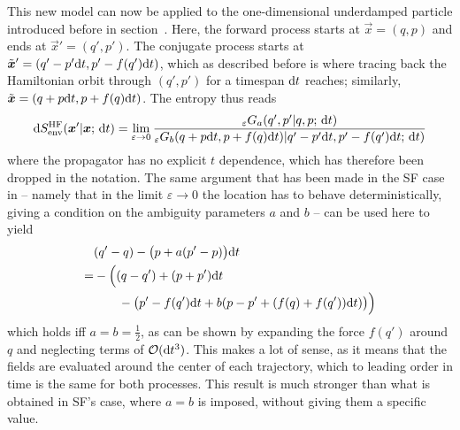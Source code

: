 This new model can now be applied to the one-dimensional underdamped particle introduced before in section~. Here, the forward process starts at \(\vec x = (q,p)\) and ends at \(\vec x' = (q',p')\). The conjugate process starts at \(\tilde{\boldsymbol{x}}' = (q'-p'\mathrm{d} t, p'-f(q')\mathrm{d} t)\), which as described before is where tracing back the Hamiltonian orbit through \((q',p')\) for a timespan \(\mathrm{d} t\) reaches; similarly, \(\tilde{\boldsymbol{x}} = (q+p\mathrm{d} t, p+f(q)\mathrm{d} t)\). The entropy thus reads
%
\begin{equation}
	\label{eqn:flow entropy quotient}
	\mathrm{d}S_\text{env}^{\text{HF}}(\boldsymbol{x}'|\boldsymbol{x};\,\mathrm{d} t)
	= \lim_{\varepsilon\to0}
		\frac{
			_\varepsilon G_a(q',p'|q,p;\,\mathrm{d} t)
		}{
			_\varepsilon G_b(q+p\mathrm{d} t, p+f(q)\mathrm{d} t)|q'-p'\mathrm{d} t, p'-f(q')\mathrm{d} t;\,\mathrm{d} t)
		}
\end{equation}
%
where the propagator has no explicit \(t\) dependence, which has therefore been dropped in the notation. The same argument that has been made in the SF case in  -- namely that in the limit \(\varepsilon\to0\) the location has to behave deterministically, giving a condition on the ambiguity parameters \(a\) and \(b\) -- can be used here to yield
%
\begin{equation}
	\begin{split}
	&(q'-q)-\bigl(p+a(p'-p)\bigr)\mathrm{d} t
	\\=&
	-\Bigl( (q-q')+(p+p')\mathrm{d} t \\
	&\qquad - \bigl( p'-f(q')\mathrm{d} t + b(p-p'+(f(q)+f(q'))\mathrm{d} t)\bigr) \Bigr)
	\end{split}
\end{equation}
%
which holds iff \(a = b = \tfrac12\), as can be shown by expanding the force \(f(q')\) around \(q\) and neglecting terms of \(\mathcal{O}(\mathrm{d} t^3)\). This makes a lot of sense, as it means that the fields are evaluated around the center of each trajectory, which to leading order in time is the same for both processes. This result is much stronger than what is obtained in SF's case, where \(a = b\) is imposed, without giving them a specific value.

